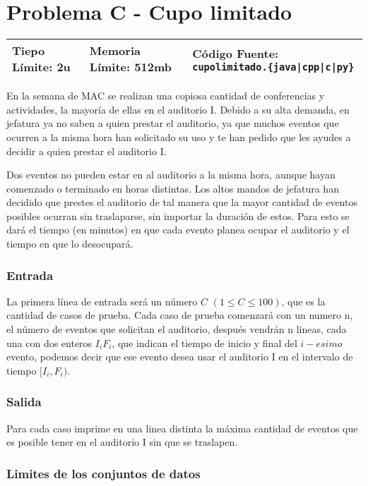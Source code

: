\chapter*{Problema C - Cupo limitado}

\begin{center}
  \begin{tabular}{ | l | l | l | }
    \hline
    Tiepo Límite: 2u & Memoria Límite: 512mb & Código Fuente: \texttt{cupolimitado.\{java|cpp|c|py\}} \\
    \hline
  \end{tabular}
\end{center}

En la semana de MAC se realizan una copiosa cantidad de conferencias y actividades, la mayoría de ellas en el auditorio I. Debido a su alta demanda, en jefatura ya no saben a quien prestar el auditorio, ya que muchos eventos que ocurren a la misma hora han solicitado su uso y te han pedido que les ayudes a decidir a quien prestar el auditorio I.

Dos eventos no pueden estar en al auditorio a la misma hora, aunque hayan comenzado o terminado en horas distintas. Los altos mandos de jefatura han decidido que prestes el auditorio de tal manera que la mayor cantidad de eventos posibles ocurran sin traslaparse, sin importar la duración de estos. Para esto se dará el tiempo (en minutos) en que cada evento planea ocupar el auditorio y el tiempo en que lo desocupará.

\subsection*{Entrada}

La primera línea de entrada será un número $C$ $(1 \leq  C\leq 100)$, que es la cantidad de casos de prueba. Cada caso de prueba comenzará con un numero n, el número de eventos que solicitan el auditorio, después vendrán n lineas, cada una con dos enteros $I_i F_i$, que indican el tiempo de inicio y final del $i-esimo$ evento, podemos decir que ese evento desea usar el auditorio I en el intervalo de tiempo $[I_i, F_i)$.

\subsection*{Salida}
Para cada caso imprime en una linea distinta la máxima cantidad de eventos que es posible tener en el auditorio I sin que se traslapen.

\subsection*{Limites de los conjuntos de datos}

